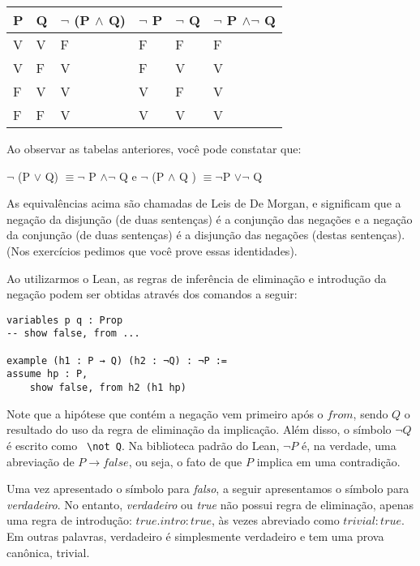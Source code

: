 \begin{table}[htb]
\centering
\begin{tabular}{|l|l|l|l|l|l|}
\hline
\textbf{P} & \textbf{Q} & \textbf{$\neg$ (P $\land$ Q)} & \textbf{$\neg $ P} & \textbf{$\neg$ Q} & \textbf{$\neg$ P $\land \neg$ Q}
\\ \hline
V          & V          & F     &F      &F  &F    \\ \hline
V          & F          & V     &F      &V  &V   \\ \hline
F          & V          & V     &V      &F  &V    \\ \hline
F          & F          & V     &V      &V  &V    \\ \hline

\end{tabular}
\end{table}

Ao observar as tabelas anteriores, você pode constatar que:

$\neg$ (P $\lor$ Q) $\equiv \neg$ P $\land \neg$ Q e $\neg$ (P $\land$ Q ) $\equiv \neg $P $\lor \neg$ Q    

\bigbreak
As equivalências acima são chamadas de Leis de De Morgan, e significam que a negação da disjunção (de duas sentenças) é a conjunção das negações e a negação da conjunção (de duas sentenças) é a disjunção das negações (destas sentenças). (Nos exercícios pedimos que você prove essas identidades). 

Ao utilizarmos o Lean, as regras de inferência de eliminação e introdução da negação podem ser obtidas através dos comandos a seguir: 

\begin{lstlisting} 
variables p q : Prop
-- show false, from ...

example (h1 : P → Q) (h2 : ¬Q) : ¬P :=
assume hp : P,
    show false, from h2 (h1 hp)
\end{lstlisting} 

Note que a hipótese que contém a negação vem primeiro após o $from $, sendo $Q$ o resultado do uso da regra de eliminação da implicação. Além disso, o símbolo $\neg Q$ é escrito como \verb| \not Q|. Na biblioteca padrão do Lean, $ \neg P$ é, na verdade, uma abreviação de $ P \rightarrow false $, ou seja, o fato de que $P$ implica em uma contradição.

Uma vez apresentado o símbolo para \textit{falso}, a seguir apresentamos o símbolo para \textit{verdadeiro}. No entanto,  \textit{verdadeiro} ou \textit{true} não possui regra de eliminação, apenas uma regra de introdução:
$true.intro: true$, às vezes abreviado como $trivial: true$. Em outras palavras, verdadeiro é simplesmente verdadeiro e tem uma prova canônica, trivial.
 
